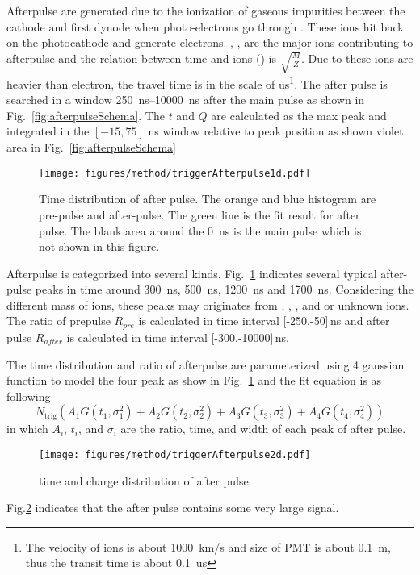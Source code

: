 Afterpulse are generated due to the ionization of gaseous impurities between the cathode and first dynode when photo-electrons go through \cite{Coates_1973}. These ions hit back on the photocathode and generate electrons. , ,  are the major ions contributing to afterpulse and the relation between time and ions () is $\sqrt{\frac{M}{Z}}$\cite{Coates_1973}. Due to these ions are heavier than electron, the travel time is in the scale of \si{us}\footnote{The velocity of ions is about \SI{1000}{km/s} and size of PMT is about \SI{0.1}{m}, thus the transit time is about \SI{0.1}{us}}. The after pulse is searched in a window \SIrange{250}{10000}{ns} after the main pulse as shown in Fig.~\ref{fig:afterpulseSchema}. The $t$ and $Q$ are calculated as the max peak and integrated in the $[-15,75]$ ns window relative to peak position as shown violet area in Fig.~\ref{fig:afterpulseSchema}
\begin{figure}[!htbp]
    \centering
    \texttt{[image: figures/method/triggerAfterpulse1d.pdf]}
    \caption{Time distribution of after pulse. The orange and blue histogram are pre-pulse and after-pulse. The green line is the fit result for after pulse. The blank area around the \SI{0}{ns} is the main pulse which is not shown in this figure.}
    \label{fig:afterpulse1d}
\end{figure}

Afterpulse is categorized into several kinds. Fig.~\ref{fig:afterpulse1d} indicates several typical after-pulse peaks in time around \SI{300}{ns}, \SI{500}{ns}, \SI{1200}{ns} and \SI{1700}{ns}. Considering the different mass of ions, these peaks may originates from , , , and  or unknown ions.
The ratio of prepulse $R_{pre}$ is calculated in time interval [-250,-50]\,ns and after pulse $R_{after}$ is calculated in time interval [-300,-10000]\,ns. 

The time distribution and ratio of afterpulse are parameterized using 4 gaussian function to model the four peak as show in Fig.~\ref{fig:afterpulse1d} and the fit equation is as following
\begin{equation}
    N_{\mathrm{trig}}(A_1G(t_1,\sigma_1^2)+A_2G(t_2,\sigma_2^2)+A_3G(t_3,\sigma_3^2)+A_4G(t_4,\sigma_4^2))
\end{equation}
in which $A_i$, $t_i$, and $\sigma_i$ are the ratio, time, and width of each peak of after pulse.
\begin{figure}[!htbp]
    \texttt{[image: figures/method/triggerAfterpulse2d.pdf]}
    \caption{time and charge distribution of after pulse}
    \label{fig:afterpulse2d}
\end{figure}
Fig.\ref*{fig:afterpulse2d} indicates that the after pulse contains some very large signal.
